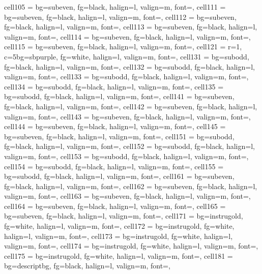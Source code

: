 \documentclass[a4paper,12pt]{article}
\begin{document}
\begin{longtblr}
{  cell{10}{5} = {bg=subeven, fg=black, halign=l, valign=m, font=\footnotesize},
  cell{11}{1} = {bg=subeven, fg=black, halign=l, valign=m, font=\footnotesize},
  cell{11}{2} = {bg=subeven, fg=black, halign=l, valign=m, font=\footnotesize},
  cell{11}{3} = {bg=subeven, fg=black, halign=l, valign=m, font=\footnotesize},
  cell{11}{4} = {bg=subeven, fg=black, halign=l, valign=m, font=\footnotesize},
  cell{11}{5} = {bg=subeven, fg=black, halign=l, valign=m, font=\footnotesize},
  cell{12}{1} = {r=1, c=5}{bg=sbpurple, fg=white, halign=l, valign=m, font=\small\bfseries},
  cell{13}{1} = {bg=subodd, fg=black, halign=l, valign=m, font=\footnotesize},
  cell{13}{2} = {bg=subodd, fg=black, halign=l, valign=m, font=\footnotesize},
  cell{13}{3} = {bg=subodd, fg=black, halign=l, valign=m, font=\footnotesize},
  cell{13}{4} = {bg=subodd, fg=black, halign=l, valign=m, font=\footnotesize},
  cell{13}{5} = {bg=subodd, fg=black, halign=l, valign=m, font=\footnotesize},
  cell{14}{1} = {bg=subeven, fg=black, halign=l, valign=m, font=\footnotesize},
  cell{14}{2} = {bg=subeven, fg=black, halign=l, valign=m, font=\footnotesize},
  cell{14}{3} = {bg=subeven, fg=black, halign=l, valign=m, font=\footnotesize},
  cell{14}{4} = {bg=subeven, fg=black, halign=l, valign=m, font=\footnotesize},
  cell{14}{5} = {bg=subeven, fg=black, halign=l, valign=m, font=\footnotesize},
  cell{15}{1} = {bg=subodd, fg=black, halign=l, valign=m, font=\footnotesize},
  cell{15}{2} = {bg=subodd, fg=black, halign=l, valign=m, font=\footnotesize},
  cell{15}{3} = {bg=subodd, fg=black, halign=l, valign=m, font=\footnotesize},
  cell{15}{4} = {bg=subodd, fg=black, halign=l, valign=m, font=\footnotesize},
  cell{15}{5} = {bg=subodd, fg=black, halign=l, valign=m, font=\footnotesize},
  cell{16}{1} = {bg=subeven, fg=black, halign=l, valign=m, font=\footnotesize},
  cell{16}{2} = {bg=subeven, fg=black, halign=l, valign=m, font=\footnotesize},
  cell{16}{3} = {bg=subeven, fg=black, halign=l, valign=m, font=\footnotesize},
  cell{16}{4} = {bg=subeven, fg=black, halign=l, valign=m, font=\footnotesize},
  cell{16}{5} = {bg=subeven, fg=black, halign=l, valign=m, font=\footnotesize},
  cell{17}{1} = {bg=instrugold, fg=white, halign=l, valign=m, font=\footnotesize},
  cell{17}{2} = {bg=instrugold, fg=white, halign=l, valign=m, font=\footnotesize},
  cell{17}{3} = {bg=instrugold, fg=white, halign=l, valign=m, font=\footnotesize},
  cell{17}{4} = {bg=instrugold, fg=white, halign=l, valign=m, font=\footnotesize},
  cell{17}{5} = {bg=instrugold, fg=white, halign=l, valign=m, font=\footnotesize},
  cell{18}{1} = {bg=descriptbg, fg=black, halign=l, valign=m, font=\footnotesize},
}
\end{longtblr}
\end{document}
